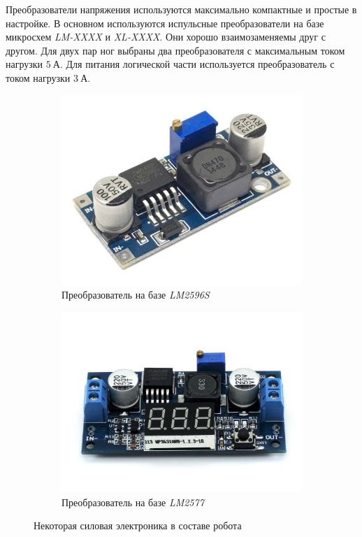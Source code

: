 Преобразователи напряжения используются максимально компактные и простые в настройке. В основном используются испульсные преобразователи на базе микросхем \textit{LM-XXXX} и \textit{XL-XXXX}. Они хорошо взаимозаменяемы друг с другом. Для двух пар ног выбраны два преобразователя с максимальным током нагрузки $ 5 \: А $. Для питания логической части используется преобразователь с током нагрузки $ 3 \: А $.
\begin{figure}[ht]
    \centering
    \begin{subfigure}[b]{0.45\textwidth}    
        \centering
        \includegraphics[scale=0.30]{chapter_mechanics_construction/figure4.jpg}
        \caption{Преобразователь на базе \textit{LM2596S}}
    \end{subfigure}
    \begin{subfigure}[b]{0.45\textwidth}
        \centering
        \includegraphics[scale=0.15]{chapter_mechanics_construction/figure5.jpg}
        \caption{Преобразователь на базе \textit{LM2577}}
    \end{subfigure}
     
    \caption{Некоторая силовая электроника в составе робота}
    \label{}
\end{figure}

